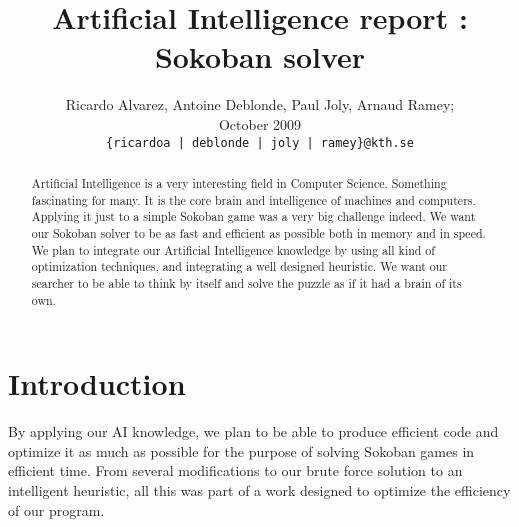 \documentclass[journal]{IEEEtran}
\title{
Artificial Intelligence report : Sokoban solver
}
\author{
Ricardo Alvarez,
Antoine Deblonde,
Paul Joly,
Arnaud Ramey;
\IEEEmembership{KTH -- Stockholm, Sweden} \\
October 2009 \\
{\tt \{ricardoa | deblonde | joly | ramey\}@kth.se}
}
\begin{document}
\maketitle



\begin{abstract}
Artificial Intelligence is a very interesting field in Computer Science. Something fascinating for many. It is the core brain and intelligence of machines and computers. Applying it just to a simple Sokoban game was a very big challenge indeed. We want our Sokoban solver to be as fast and efficient as possible both in memory and in speed.  We plan to integrate our Artificial Intelligence knowledge by using all kind of optimization techniques, and integrating a well designed heuristic. We want our searcher to be able to think by itself and solve the puzzle as if it had a brain of its own.
\end{abstract}
%
%
%

\tableofcontents
\section{Introduction}
By applying our AI knowledge, we plan to be able to produce efficient code and optimize it as much as possible for the purpose of solving Sokoban games in efficient time. From several modifications to our brute force solution to an intelligent heuristic, all this was part of a work designed to optimize the efficiency of our program.
\end{document}
